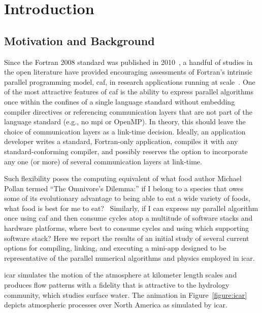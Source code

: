 \section{Introduction}
\subsection{Motivation and Background}
Since the Fortran 2008 standard was published in 2010~\cite{iso2010information}, a handful of studies in the open literature
have provided encouraging assessments of Fortran's intrinsic parallel programming model, \gls{caf}, in research
applications running at scale~\cite{preissl2011multithreaded,garain2015comparing,mozdzynski2015partitioned}.   One of the
most attractive features of \gls{caf} is the ability to express parallel algorithms once within the confines of a single
language standard without embedding compiler directives or referencing communication layers that are not part of the
language standard (e.g., no \gls{mpi} or OpenMP).  In theory, this should leave the choice of communication layers
as a link-time decision.  Ideally, an application developer writes a standard, Fortran-only application, compiles it with any
standard-conforming compiler, and possibly reserves the option to incorporate any one (or more) of several communication layers
at link-time.

Such flexibility poses the computing equivalent of what food author Michael Pollan termed ``The Omnivore's Dilemma:'' if I
belong to a species that owes some of its evolutionary advantage to being able to eat a wide variety of foods, what food is
best for me to eat?~\cite{pollan2006omnivore}  Similarly, if I can express my parallel algorithm once using \gls{caf} and then consume cycles atop a
multitude of software stacks and hardware platforms, where best to consume cycles and using which supporting software stack?
Here we report the results of an initial study of several current options for compiling, linking, and executing a \gls{mini-app}
designed to be representative of the parallel numerical algorithms and physics employed in \gls{icar}.

\gls{icar} simulates the motion of the atmosphere at kilometer length scales and produces flow patterns with a fidelity that is
attractive to the hydrology community, which studies surface water.  The animation in Figure~\ref{figure:icar} depicts atmospheric
processes over North America as simulated by \gls{icar}.

